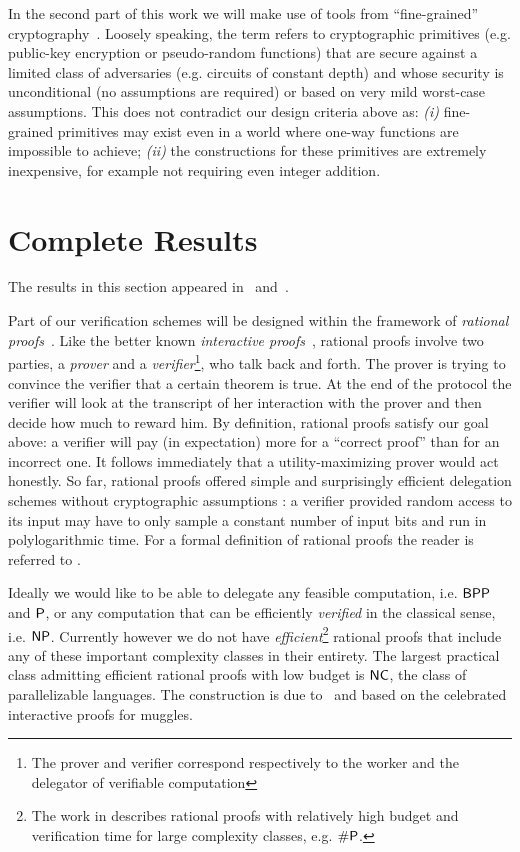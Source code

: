 In the second part of this work we will make use of tools from ``fine-grained'' cryptography~\cite{fgcrypto}. Loosely speaking, the term refers to cryptographic primitives (e.g. public-key encryption or pseudo-random functions) that are secure against a limited class of adversaries (e.g. circuits of constant depth) and whose security is unconditional (no assumptions are required) or based on very mild worst-case assumptions. This does not contradict our design criteria above as: \textit{(i)} fine-grained primitives may exist even in a world  where one-way functions are impossible to achieve; \textit{(ii)} the constructions for these primitives are extremely inexpensive, for example not requiring even integer addition.

\section{Complete Results}

The results in this section appeared in~\cite{cg15} and~\cite{cg17}.

Part of our verification schemes will be designed within the framework of \textit{rational proofs}~\cite{am}. Like the better known \textit{interactive proofs}~\cite{gmr}, rational proofs involve two parties, a \textit{prover} and a \textit{verifier}\footnote{The prover and verifier correspond respectively to the worker and the delegator of verifiable computation}, who talk back and forth. The prover is trying to convince the verifier that a certain theorem is true. At the end of the protocol the verifier will look at the transcript of her interaction with the prover and then decide how much to reward him.
By definition, rational proofs satisfy our goal above: a verifier will pay (in expectation) more for a ``correct proof'' than for an incorrect one. It follows immediately that a utility-maximizing prover would act honestly.
So far, rational proofs offered simple and surprisingly efficient delegation schemes without cryptographic assumptions \cite{am1,ratargs,ratsumchecks}: a verifier provided random access to its input may have to only sample a constant number of input bits and run in polylogarithmic time. For  a formal definition of rational proofs the reader is referred to \cite{cg15}.

Ideally we would like to be able to delegate any feasible computation, i.e. $\BPP$ and $\P$, or any computation that can be efficiently  \textit{verified} in the classical sense, i.e. $\NP$. Currently however we do not have \textit{efficient}\footnote{The work in \cite{am} describes rational proofs with relatively high budget and verification time for large complexity classes, e.g. $\#\P$.} rational proofs that include any of these important complexity classes in their entirety. The largest practical class admitting efficient rational proofs with low budget is $\NC$, the class of parallelizable languages. The construction is due to~\cite{ratsumchecks} and based on the celebrated interactive proofs for muggles\cite{muggles}.

